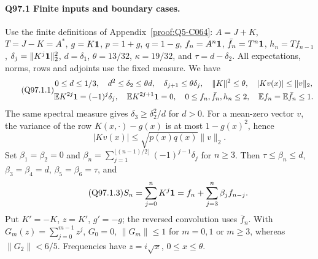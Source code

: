 \paragraph{Q97.1 Finite inputs and boundary cases.}
Use the finite definitions of Appendix~\ref{proof:Q5-C064}:
\(A=\allowbreak J+K\), \(T=\allowbreak J-K=\allowbreak A^*\), \(g=\allowbreak K\mathbf1\), \(p=\allowbreak 1+g\), \(q=\allowbreak 1-g\),
\(f_n=\allowbreak A^n\mathbf1\), \(\bar f_n=\allowbreak T^n\mathbf1\), \(h_n=\allowbreak Tf_{n-1}\),
\(\delta_j=\allowbreak \|K^j\mathbf1\|_2^2\), \(d=\allowbreak \delta_1\),
\(\theta=\allowbreak 13/32\), \(\kappa=\allowbreak 19/32\), and \(\tau=\allowbreak d-\delta_2\).
All expectations, norms, rows and adjoints use the fixed measure. We have
\begin{equation}\tag{Q97.1.1}\label{eq:Q97:1.1}
\begin{gathered}
0\le d\le1/3,\quad d^2\le\delta_2\le\theta d,\quad
\delta_{j+1}\le\theta\delta_j,\quad\|K\|^2\le\theta,\quad
|Kv(x)|\le\|v\|_2,\\
\mathbb E K^{2j}\mathbf1=(-1)^j\delta_j,\quad\mathbb E K^{2j+1}\mathbf1=0,\quad
0\le f_n,\bar f_n,h_n\le2,\quad\mathbb E f_n=\mathbb E\bar f_n\le1.
\end{gathered}
\end{equation}
The same spectral measure gives \(\delta_3\ge\allowbreak \delta_2^2/d\) for \(d>\allowbreak 0\).
For a mean-zero vector \(v\), the variance of the row
\(K(x,\allowbreak \cdot)-g(x)\) is at most \(1-g(x)^2\), hence
\begin{equation}\tag{Q97.1.2}\label{eq:Q97:1.2}
|Kv(x)|\le\sqrt{p(x)q(x)}\|v\|_2.
\end{equation}
Set \(\beta_1=\allowbreak \beta_2=\allowbreak 0\) and
\(\beta_n=\allowbreak \sum_{j=\allowbreak 1}^{\lfloor(n-1)/2\rfloor}(-1)^{j-1}\delta_j\)
for \(n\ge\allowbreak 3\). Then \(\tau\le\allowbreak \beta_n\le\allowbreak  d\),
\(\beta_3=\allowbreak \beta_4=\allowbreak d\), \(\beta_5=\allowbreak \beta_6=\allowbreak \tau\), and
\begin{equation}\tag{Q97.1.3}\label{eq:Q97:1.3}
S_n=\sum_{j=0}^nK^j\mathbf1=f_n+\sum_{j=3}^n\beta_j f_{n-j}.
\end{equation}
Put \(K'=\allowbreak -K\), \(z=\allowbreak K'\), \(g'=\allowbreak -g\); the reversed convolution uses
\(\bar f_n\). With \(G_m(z)=\allowbreak \sum_{j=\allowbreak 0}^{m-1}z^j\), \(G_0=\allowbreak 0\),
\(\|G_m\|\le\allowbreak 1\) for \(m=\allowbreak 0,\allowbreak 1\) or \(m\ge\allowbreak 3\), whereas
\(\|G_2\|<\allowbreak 6/5\). Frequencies have \(z=\allowbreak i\sqrt x\), \(0\le\allowbreak  x\le\allowbreak \theta\).
